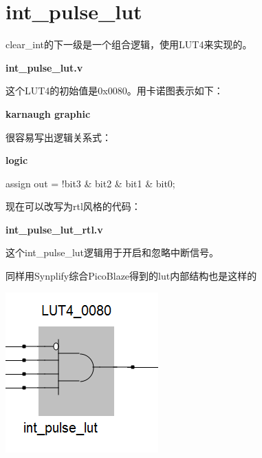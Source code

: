 \section{int\_pulse\_lut}

clear\_int的下一级是一个组合逻辑，使用LUT4来实现的。

\textbf{int\_pulse\_lut.v}


这个LUT4的初始值是0x0080。用卡诺图表示如下：

\textbf{karnaugh graphic}


很容易写出逻辑关系式：

\textbf{logic}
\begin{vcode}
assign out = !bit3 & bit2 & bit1 & bit0;
\end{vcode}

现在可以改写为rtl风格的代码：

\textbf{int\_pulse\_lut\_rtl.v}


这个int\_pulse\_lut逻辑用于开启和忽略中断信号。

同样用Synplify综合PicoBlaze得到的lut内部结构也是这样的

\includegraphics{int_pulse_lut}

